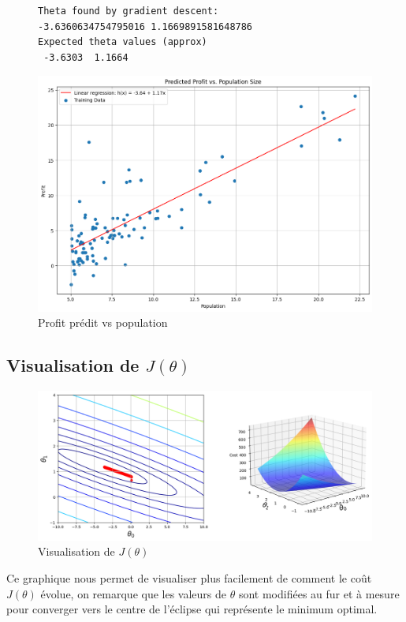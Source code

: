 \begin{figure}[!h]
    \begin{minipage}{.48\linewidth}
\begin{verbatim}
Theta found by gradient descent: 
-3.6360634754795016 1.1669891581648786
Expected theta values (approx)
 -3.6303  1.1664
\end{verbatim}   
 \label{listing:output_gradientDescent}
    \end{minipage}\hfill
    \begin{minipage}{.48\linewidth}
        \begin{center}
            \includegraphics[width=1\textwidth]{./img/4-2-4(2).png}
            \caption{\label{fig:fig2}Profit prédit vs population}  
        \end{center}
    \end{minipage}
\end{figure}



\clearpage


\subsection{Visualisation de $J(\theta)$}


\begin{figure}[!h]
    \begin{center}
        \includegraphics[width=1\textwidth]{./img/4-3.png}
        \caption{\label{fig:fig3}Visualisation de $J(\theta)$}  
    \end{center}
\end{figure}

Ce graphique nous permet de visualiser plus facilement de comment le coût $J(\theta)$ évolue, on remarque que les valeurs de $\theta$ sont modifiées au fur et à mesure pour converger vers le centre de l'éclipse qui représente
le minimum optimal.


